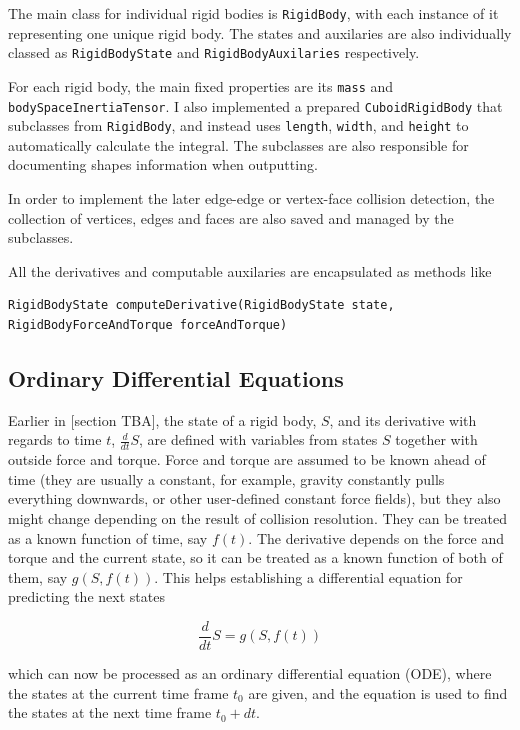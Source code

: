 \documentclass[12pt,a4paper,twoside,openright]{report}
\newcommand{\code}{\texttt}
\begin{document}
The main class for individual rigid bodies is \code{RigidBody}, with each instance of it representing one unique rigid body. The states and auxilaries are also individually classed as \code{RigidBodyState} and \code{RigidBodyAuxilaries} respectively.

For each rigid body, the main fixed properties are its \code{mass} and \code{bodySpaceInertiaTensor}. I also implemented a prepared \code{CuboidRigidBody} that subclasses from \code{RigidBody}, and instead uses \code{length}, \code{width}, and \code{height} to automatically calculate the integral. The subclasses are also responsible for documenting shapes information when outputting.

In order to implement the later edge-edge or vertex-face collision detection, the collection of vertices, edges and faces are also saved and managed by the subclasses.

All the derivatives and computable auxilaries are encapsulated as methods like 

\begin{verbatim}
RigidBodyState computeDerivative(RigidBodyState state, 
RigidBodyForceAndTorque forceAndTorque)
\end{verbatim}

\subsection{Ordinary Differential Equations}

Earlier in [section TBA], the state of a rigid body, $S$, and its derivative with regards to time $t$, $\frac{d}{dt}S$, are defined with variables from states $S$ together with outside force and torque. Force and torque are assumed to be known ahead of time (they are usually a constant, for example, gravity constantly pulls everything downwards, or other user-defined constant force fields), but they also might change depending on the result of collision resolution. They can be treated as a known function of time, say $f(t)$. The derivative depends on the force and torque and the current state, so it can be treated as a known function of both of them, say $g(S, f(t))$. This helps establishing a differential equation for predicting the next states

\begin{equation}
\frac{d}{dt}S = g(S, f(t))
\end{equation}

which can now be processed as an ordinary differential equation (ODE), where the states at the current time frame $t_0$ are given, and the equation is used to find the states at the next time frame $t_0 + dt$.
\end{document}
